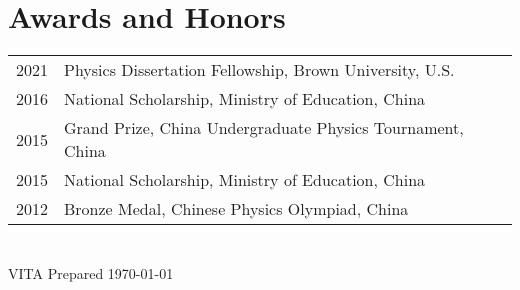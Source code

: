\documentclass[11pt,letterpaper]{article}
\begin{document}
\section*{Awards and Honors}
\vspace*{-0.15in}
\begin{longtable}{l p{\linewidth}}
    2021 & Physics Dissertation Fellowship, Brown University, U.S.    \\
    2016 & National Scholarship, Ministry of Education, China         \\
    2015 & Grand Prize, China Undergraduate Physics Tournament, China \\
    2015 & National Scholarship, Ministry of Education, China         \\
    2012 & Bronze Medal, Chinese Physics Olympiad, China
\end{longtable}

\section*{}
VITA Prepared \today
\end{document}

